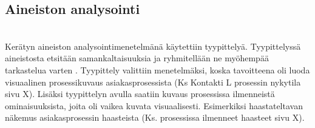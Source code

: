 \documentclass[finnish,12pt,a4paper,pdftex]{article}
\begin{document}
\subsection{Aineiston analysointi}\\
Kerätyn aineiston analysointimenetelmänä käytettiin tyypittelyä. Tyypittelyssä aineistosta etsitään samankaltaisuuksia ja ryhmitellään ne myöhempää tarkastelua varten \citep{eskola}. Tyypittely valittiin menetelmäksi, koska tavoitteena oli luoda visuaalinen prosessikuvaus asiakasprosessista (Ks Kontakti L prosessin nykytila sivu X). Lisäksi tyypittelyn avulla saatiin kuvaus prosessissa ilmenneistä ominaisuuksista, joita oli vaikea kuvata visuaalisesti. Esimerkiksi haastateltavan näkemus asiakasprosessin haasteista (Ks. prosessissa ilmenneet haasteet sivu X). \\
\\
\\
\\













\end{document}
